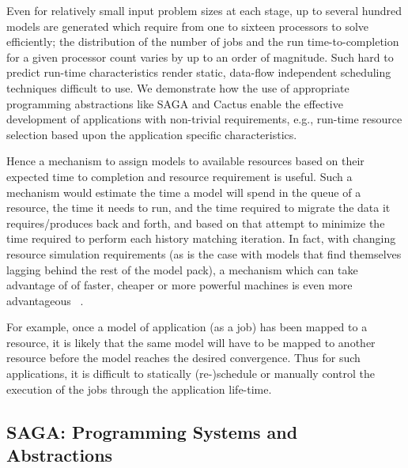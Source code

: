 \documentclass[conference,final]{IEEEtran}
\begin{document}
Even for relatively small input problem sizes at each stage, up to
several hundred models are generated which require from one to sixteen
processors to solve efficiently; the distribution of the number of
jobs and the run time-to-completion for a given processor count varies
by up to an order of magnitude.  Such hard to predict run-time
characteristics render static, data-flow independent scheduling
techniques difficult to use.  We demonstrate how the use of
appropriate programming abstractions like SAGA and Cactus enable the
effective development of applications with non-trivial requirements,
e.g., run-time resource selection based upon the application specific
characteristics.

Hence a mechanism to assign models to available resources based on
their expected time to completion and resource requirement is useful.
Such a mechanism would estimate the time a model will spend in the
queue of a resource, the time it needs to run, and the time required
to migrate the data it requires/produces back and forth, and based on
that attempt to minimize the time required to perform each history
matching iteration.  In fact, with changing resource simulation
requirements (as is the case with models that find themselves lagging
behind the rest of the model pack), a mechanism which can take
advantage of of faster, cheaper or more powerful machines is even more
advantageous ~\cite{escience07}.

For example, once a model of application (as a job) has been mapped to
a resource, it is likely that the same model will have to be mapped to
another resource before the model reaches the desired convergence.
Thus for such applications, it is difficult to statically
(re-)schedule or manually control the execution of the jobs through
the application life-time.


\subsection{SAGA: Programming Systems and Abstractions}

\end{document}
